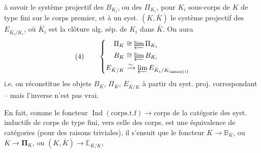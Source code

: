 à savoir le système projectif des $B_{K_i}$, ou des $\Pi_{K_i}$, pour $K_i$ sous-corps de $K$ de type fini sur le corps premier, et à un syst. $(K,\bar K)$ le système projectif des $E_{\bar K_i/K_i}$, où $\bar K_i$ est la clôture alg. sép. de $K_i$ dans $\bar K$. On aura
\[
(4)\qquad\left\{\begin{aligned}
\Pi_K&\cong\varprojlim\Pi_{K_i}\\
B_K&\cong\varprojlim B_{K_i}\\
E_{\bar K/K}&\xrightarrow{\sim}\varprojlim E_{\bar K_i/K_{\unsure{i}}}
\end{aligned}\right.
\]
i.e. on réconstitue les objets $B_K$, $\Pi_K$, $E_{\bar K/K}$ à partir du syst. proj. correspondant -- mais l'inverse n'est pas vrai.

En fait, comme le foncteur $\operatorname{Ind}(\text{corps.t.f})\longrightarrow\text{corps}$ de la catégorie des syst. inductifs de corps de type fini, vers celle des corps, est une équivalence de catégories (pour des raisons triviales), il s'ensuit que le foncteur $K\longrightarrow\mathbb{B}_K$, ou $K\longrightarrow\boldsymbol{\Pi}_K$, ou $(K,\bar K)\longrightarrow\mathbb{E}_{\bar K/K}$, 
